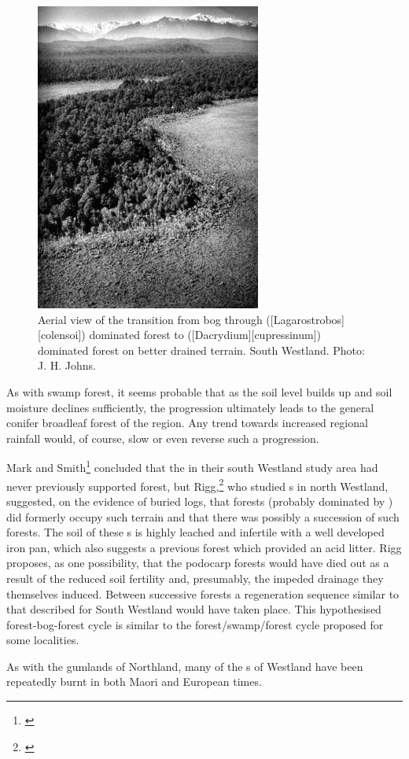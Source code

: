 \begin{figure}
	\includegraphics[width=0.66\textwidth]{graphics/figure68transition.jpg}
	\centering
	\caption[Aerial view of the transition from pakihi bog through silver pine to rimu]{Aerial view of the transition from  bog through  ([Lagarostrobos][colensoi]) dominated forest to  ([Dacrydium][cupressinum]) dominated forest on better drained terrain.
South Westland.
	Photo: J. H. Johns.}%
	\label{fig:68transition}
\end{figure}

As with  swamp forest, it seems probable that as the soil level builds up and soil moisture declines sufficiently, the progression ultimately leads to the general conifer broadleaf forest of the region.
Any trend towards increased regional rainfall would, of course, slow or even reverse such a progression.

Mark and Smith\footnote{\cite{mark1975lowland}} concluded that the  in their south Westland study area had never previously supported forest, but Rigg,\footnote{\cite{rigg1962pakihi}} who studied s in north Westland, suggested, on the evidence of buried logs, that forests (probably dominated by ) did formerly occupy such terrain and that there was possibly a succession of such forests.
The soil of these s is highly leached and infertile with a well developed iron pan, which also suggests a previous forest which provided an acid litter.
Rigg proposes, as one possibility, that the podocarp forests would have died out as a result of the reduced soil fertility and, presumably, the impeded drainage they themselves induced.
Between successive forests a regeneration sequence similar to that described for South Westland would have taken place.
This hypothesised forest-bog-forest cycle is similar to the forest/swamp/forest cycle proposed for some  localities.

As with the gumlands of Northland, many of the s of Westland have been repeatedly burnt in both Maori and European times.

